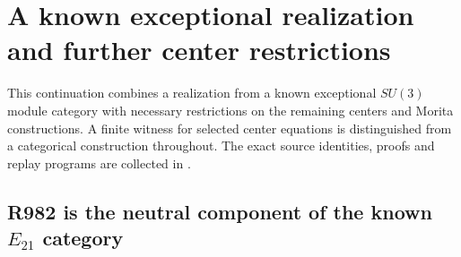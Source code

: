\section{A known exceptional realization and further center restrictions}
\label{sec:m3-creative-20261022}

This continuation combines a realization from a known exceptional
$SU(3)$ module category with necessary restrictions on the remaining
centers and Morita constructions. A finite witness for selected center
equations is distinguished from a categorical construction throughout.
The exact source identities, proofs and replay programs are collected in
.

\subsection{R982 is the neutral component of the known $E_{21}$ category}
\label{subsec:creative-e21-model}

